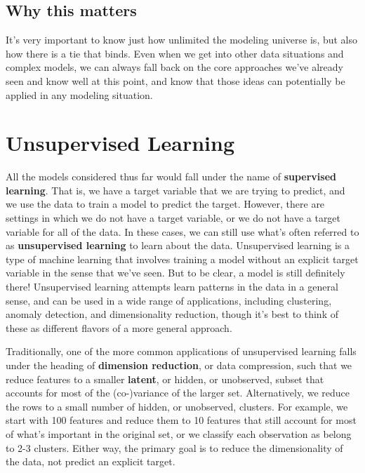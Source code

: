 \documentclass[
  letterpaper,
]{krantz}
\begin{document}
\subsection{Why this matters}\label{why-this-matters-2}

It's very important to know just how unlimited the modeling universe is,
but also how there is a tie that binds. Even when we get into other data
situations and complex models, we can always fall back on the core
approaches we've already seen and know well at this point, and know that
those ideas can potentially be applied in any modeling situation.

\section{Unsupervised Learning}\label{unsupervised-learning}

All the models considered thus far would fall under the name of
\textbf{supervised learning}. That is, we have a target variable that we
are trying to predict, and we use the data to train a model to predict
the target. However, there are settings in which we do not have a target
variable, or we do not have a target variable for all of the data. In
these cases, we can still use what's often referred to as
\textbf{unsupervised learning} to learn about the data. Unsupervised
learning is a type of machine learning that involves training a model
without an explicit target variable in the sense that we've seen. But to
be clear, a model is still definitely there! Unsupervised learning
attempts learn patterns in the data in a general sense, and can be used
in a wide range of applications, including clustering, anomaly
detection, and dimensionality reduction, though it's best to think of
these as different flavors of a more general approach.

Traditionally, one of the more common applications of unsupervised
learning falls under the heading of \textbf{dimension reduction}, or
data compression, such that we reduce features to a smaller
\textbf{latent}, or hidden, or unobserved, subset that accounts for most
of the (co-)variance of the larger set. Alternatively, we reduce the
rows to a small number of hidden, or unobserved, clusters. For example,
we start with 100 features and reduce them to 10 features that still
account for most of what's important in the original set, or we classify
each observation as belong to 2-3 clusters. Either way, the primary goal
is to reduce the dimensionality of the data, not predict an explicit
target.
\end{document}
